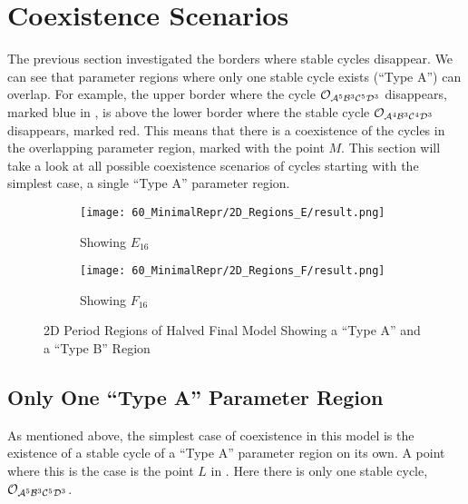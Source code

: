 \section{Coexistence Scenarios}
\label{sec:minrep.coex}


The previous section investigated the borders where stable cycles disappear.
We can see that parameter regions where only one stable cycle exists (``Type A'') can overlap.
For example, the upper border where the cycle $\mathcal{O}_{\mathcal{A}^5\mathcal{B}^3\mathcal{C}^5\mathcal{D}^3}$ disappears, marked blue in , is above the lower border where the stable cycle $\mathcal{O}_{\mathcal{A}^4\mathcal{B}^3\mathcal{C}^4\mathcal{D}^3}$ disappears, marked red.
This means that there is a coexistence of the cycles in the overlapping parameter region, marked with the point $M$.
This section will take a look at all possible coexistence scenarios of cycles starting with the simplest case, a single ``Type A'' parameter region.

\begin{figure}
    \centering
    \begin{subfigure}{0.4\textwidth}
        \centering
        \texttt{[image: 60\_MinimalRepr/2D\_Regions\_E/result.png]}
        \caption{Showing $E_{16}$}
        \label{fig:final.regions.E.halved}
    \end{subfigure}
    \begin{subfigure}{0.4\textwidth}
        \centering
        \texttt{[image: 60\_MinimalRepr/2D\_Regions\_F/result.png]}
        \caption{Showing $F_{16}$}
        \label{fig:final.regions.F.halved}
    \end{subfigure}
    \caption{2D Period Regions of Halved Final Model Showing a ``Type A'' and a ``Type B'' Region}
\end{figure}

\subsection{Only One ``Type A'' Parameter Region}

As mentioned above, the simplest case of coexistence in this model is the existence of a stable cycle of a ``Type A'' parameter region on its own.
A point where this is the case is the point $L$ in .
Here there is only one stable cycle, $\mathcal{O}_{\mathcal{A}^5\mathcal{B}^3\mathcal{C}^5\mathcal{D}^3}$.


